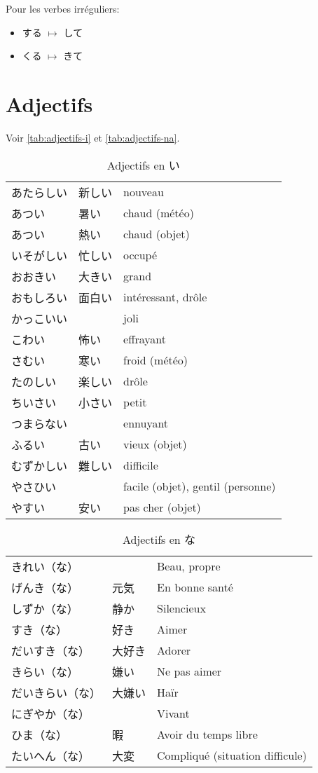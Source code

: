 \documentclass[a4paper,10pt,french,openany]{memoir}
\begin{document}
Pour les verbes irréguliers:
\begin{itemize}
 \item する $\mapsto$ して
 \item くる $\mapsto$ きて
\end{itemize}


\section{Adjectifs}

Voir \autoref{tab:adjectifs-i} et \autoref{tab:adjectifs-na}.

\begin{table}[h]
 \centering
 \caption{Adjectifs en い}
 \label{tab:adjectifs-i}
 \begin{tabular}{lll}
  あたらしい & 新しい & nouveau \\
  あつい & 暑い & chaud (météo) \\
  あつい & 熱い & chaud (objet) \\
  いそがしい & 忙しい & occupé \\
  おおきい & 大きい & grand \\
  おもしろい & 面白い & intéressant, drôle \\
  かっこいい & & joli \\
  こわい & 怖い & effrayant \\
  さむい & 寒い & froid (météo) \\
  たのしい & 楽しい & drôle \\
  ちいさい & 小さい & petit \\
  つまらない & & ennuyant \\
  ふるい & 古い & vieux (objet) \\
  むずかしい & 難しい & difficile \\
  やさひい & & facile (objet), gentil (personne) \\
  やすい & 安い & pas cher (objet) \\
 \end{tabular}
\end{table}

\begin{table}[h]
 \centering
 \caption{Adjectifs en な}
 \label{tab:adjectifs-na}
 \begin{tabular}{lll}
  きれい（な） & & Beau, propre \\
  げんき（な） & 元気 & En bonne santé \\
  しずか（な） & 静か & Silencieux \\
  すき（な） & 好き & Aimer \\
  だいすき（な） & 大好き & Adorer \\
  きらい（な） & 嫌い & Ne pas aimer \\
  だいきらい（な） & 大嫌い & Haïr \\
  にぎやか（な） & & Vivant \\
  ひま（な） & 暇 & Avoir du temps libre \\
  たいへん（な） & 大変 & Compliqué (situation difficule) \\
 \end{tabular}
\end{table}
\end{document}
